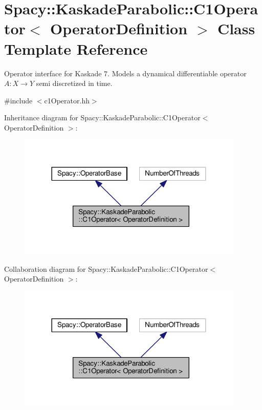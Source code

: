 \hypertarget{classSpacy_1_1KaskadeParabolic_1_1C1Operator}{\section{Spacy\-:\-:Kaskade\-Parabolic\-:\-:C1\-Operator$<$ Operator\-Definition $>$ Class Template Reference}
\label{classSpacy_1_1KaskadeParabolic_1_1C1Operator}
}


Operator interface for Kaskade 7. Models a dynamical differentiable operator $A:X\rightarrow Y$ semi discretized in time.  




{\ttfamily \#include $<$c1\-Operator.\-hh$>$}



Inheritance diagram for Spacy\-:\-:Kaskade\-Parabolic\-:\-:C1\-Operator$<$ Operator\-Definition $>$\-:
\nopagebreak
\begin{figure}[H]
\begin{center}
\leavevmode
\includegraphics[width=305pt]{classSpacy_1_1KaskadeParabolic_1_1C1Operator__inherit__graph}
\end{center}
\end{figure}


Collaboration diagram for Spacy\-:\-:Kaskade\-Parabolic\-:\-:C1\-Operator$<$ Operator\-Definition $>$\-:
\nopagebreak
\begin{figure}[H]
\begin{center}
\leavevmode
\includegraphics[width=305pt]{classSpacy_1_1KaskadeParabolic_1_1C1Operator__coll__graph}
\end{center}
\end{figure}
